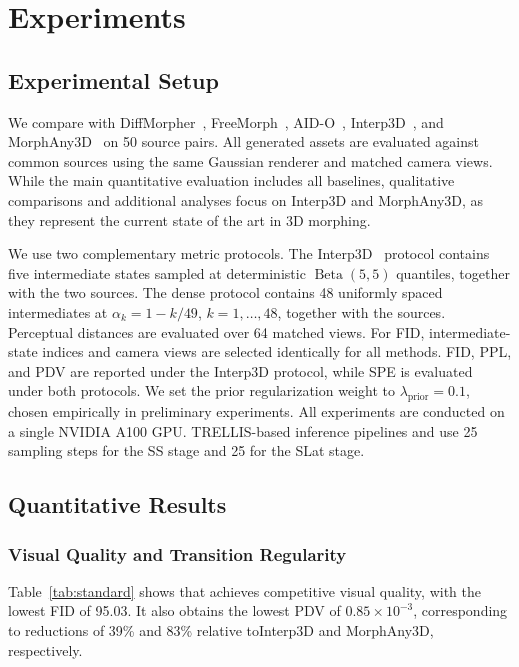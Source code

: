 \section{Experiments}
\label{sec:experiments}

\subsection{Experimental Setup}

We compare \methodname{} with DiffMorpher~\cite{zhang2024diffmorpher}, FreeMorph~\cite{cao2025freemorph}, AID-O~\cite{he2024aid}, Interp3D~\cite{liu2026interp3d}, and MorphAny3D~\cite{sun2026morphany3d} on 50 source pairs. All generated assets are evaluated against common sources using the same Gaussian renderer and matched camera views. While the main quantitative evaluation includes all baselines, qualitative comparisons and additional analyses focus on Interp3D and MorphAny3D, as they represent the current state of the art in 3D morphing.

We use two complementary metric protocols. The Interp3D~\cite{liu2026interp3d} protocol contains five intermediate states sampled at deterministic $\operatorname{Beta}(5,5)$ quantiles, together with the two sources. The dense protocol contains 48 uniformly spaced intermediates at $\alpha_k=1-k/49$, $k=1, \ldots,48$, together with the sources. Perceptual distances are evaluated over 64 matched views. For FID, intermediate-state indices and camera views are selected identically for all methods. FID, PPL, and PDV are reported under the Interp3D protocol, while SPE is evaluated under both protocols. We set the prior regularization weight to $\lambda_{\mathrm{prior}}=0.1$, chosen empirically in preliminary experiments.
All experiments are conducted on a single NVIDIA A100 GPU. TRELLIS-based inference pipelines and \methodname{} use 25 sampling steps for the SS stage and 25 for the SLat stage. 

\subsection{Quantitative Results}



\subsubsection{Visual Quality and Transition Regularity}

Table~\ref{tab:standard} shows that \methodname{} achieves competitive visual quality, with the lowest FID of 95.03. It also obtains the lowest PDV of $0.85\times10^{-3}$, corresponding to reductions of 39\% and 83\% relative toInterp3D and MorphAny3D, respectively.

